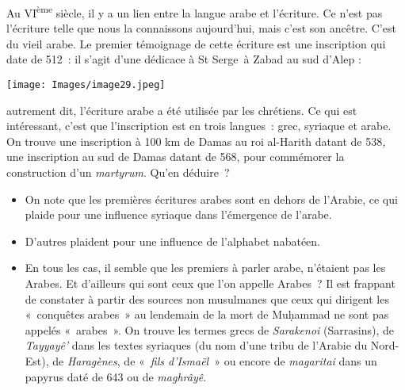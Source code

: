 Au VI\textsuperscript{ème} siècle, il y a un lien entre la langue arabe
et l'écriture. Ce n'est pas l'écriture telle que nous la connaissons
aujourd'hui, mais c'est son ancêtre. C'est du vieil arabe. Le premier
témoignage de cette écriture est une inscription qui date de 512~: il
s'agit d'une dédicace à St Serge~à Zabad au sud d'Alep :

\texttt{[image: Images/image29.jpeg]}

autrement dit, l'écriture arabe a été utilisée par les chrétiens. Ce qui
est intéressant, c'est que l'inscription est en trois langues~: grec,
syriaque et arabe. On trouve une inscription à 100 km de Damas au roi
al-Harith datant de 538\emph{,} une inscription au sud de Damas datant
de 568, pour commémorer la construction d'un \emph{martyrum}. Qu'en
déduire~?

\begin{itemize}
\item
  On note que les premières écritures arabes sont en dehors de l'Arabie,
  ce qui plaide pour une influence syriaque dans l'émergence de l'arabe.
\item
  D'autres plaident pour une influence de l'alphabet
  nabatéen.
\item
  En tous les cas, il semble que les premiers à parler arabe, n'étaient
  pas les Arabes. Et d'ailleurs qui sont ceux que l'on appelle Arabes~?
  Il est frappant de constater à partir des sources non musulmanes que
  ceux qui dirigent les «~conquêtes arabes~» au lendemain de la mort de
  Muḥammad ne sont pas appelés «~arabes~». On trouve les termes grecs de
  \emph{Sarakenoi} (Sarrasins), de \emph{Tayyayê'} dans les textes
  syriaques (du nom d'une tribu de l'Arabie du Nord-Est), de
  \emph{Haragènes}, de «~\emph{fils d'Ismaël}~» ou encore de
  \emph{magaritai} dans un papyrus daté de 643 ou de
  \emph{maghrâyê}.
\end{itemize}

